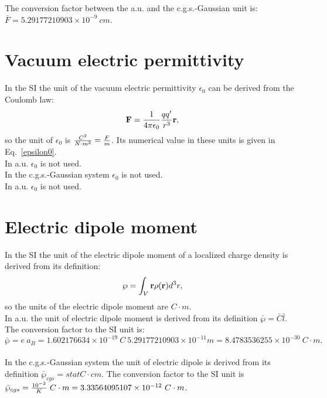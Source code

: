 \documentclass[12pt,a4paper]{article}
\def\e{1.602176634\times 10^{-19}}
\def\abohr{5.29177210903\times 10^{-11}}
\def\bardip{8.4783536255\times 10^{-30}}
\def\diptodip{3.33564095107\times 10^{-12}}
\def\barcapcgs{5.29177210903\times 10^{-9}}
\begin{document}
{\color{green} 
The conversion factor between the a.u. and the c.g.s.-Gaussian unit is: 
$\bar F = \barcapcgs \ cm$.
}


\newpage
\section{\color{coral}Vacuum electric permittivity}
In the SI the unit of the vacuum electric permittivity $\epsilon_0$
can be derived from the Coulomb law:
\begin{equation}
{\bf F} = {1\over 4 \pi \epsilon_0} {qq'\over r^3} {\bf r},
\end{equation}
so the unit of $\epsilon_0$ is ${C^2 \over N\cdot m^2}={F\over m}$. 
Its numerical
value in these units is given in Eq.~\ref{epsilon0}.
\\

{\color{web-blue} In a.u. $\epsilon_0$ is not used.} 
\\

{\color{orange} In the c.g.s.-Gaussian system $\epsilon_0$ is not used.
}
\\

{\color{green} In a.u. $\epsilon_0$ is not used. 
\\
}

\newpage
\section{\color{coral}Electric dipole moment}
In the SI the unit of the electric dipole moment of a localized
charge density is derived from its definition:
\begin{equation}
{\bf \wp}=\int_V {\bf r} \rho({\bf r}) d^3r,
\end{equation}
so the units of the electric dipole moment are $C\cdot m$.
\\

{\color{web-blue} In a.u. the unit of electric dipole moment is derived
from its definition $\bar \wp=\bar C \bar l$. The conversion factor to the
SI unit is:
\begin{equation}
\bar \wp = e\ a_B = \e\ C\ \abohr m = \bardip\ C\cdot m.
\end{equation}
} 
\\

{\color{orange} In the c.g.s.-Gaussian system the unit of electric 
dipole is derived from its definition $\bar \wp_{cgs}=statC\cdot cm$.
The conversion factor to the SI unit is $\bar \wp_{cgs}={10^{-2} \over K}
\ C\cdot m=\diptodip\ C\cdot m$.
}
\\
\end{document}
